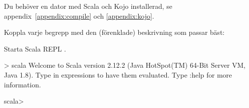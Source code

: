 
\ifPreSolution
\Exercise{\ExeWeekONE}\label{exe:W01}

\begin{Goals}

\end{Goals}

\begin{Preparations}
\item {}
\item Du behöver en dator med Scala och Kojo installerad, se appendix~\ref{appendix:compile} och  \ref{appendix:kojo}.
\end{Preparations}

\else

\ExerciseSolution{\ExeWeekONE}

\fi  %


\BasicTasks





\QUESTBEGIN

\Task \what

\vspace{1em}\noindent Koppla varje begrepp med den (förenklade) beskrivning som passar bäst:

\begin{ConceptConnections}

\end{ConceptConnections}

\SOLUTION

\TaskSolved \what

\begin{ConceptConnections}

\end{ConceptConnections}

\QUESTEND







\QUESTBEGIN

\Task \what

\vspace{1em}\noindent Starta Scala REPL .

\begin{REPLnonum}
> scala
Welcome to Scala version 2.12.2 (Java HotSpot(TM) 64-Bit Server VM, Java 1.8).
Type in expressions to have them evaluated.
Type :help for more information.

scala>
\end{REPLnonum}

